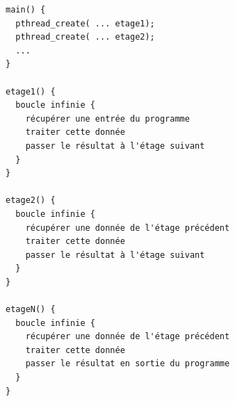 \begin{lstlisting}[frame=trBL]
main() {
  pthread_create( ... etage1);
  pthread_create( ... etage2);
  ...
}

etage1() {
  boucle infinie {
    récupérer une entrée du programme
    traiter cette donnée
    passer le résultat à l'étage suivant
  }
}

etage2() {
  boucle infinie {
    récupérer une donnée de l'étage précédent
    traiter cette donnée
    passer le résultat à l'étage suivant
  }
}

etageN() {
  boucle infinie {
    récupérer une donnée de l'étage précédent
    traiter cette donnée
    passer le résultat en sortie du programme
  }
}
\end{lstlisting}
